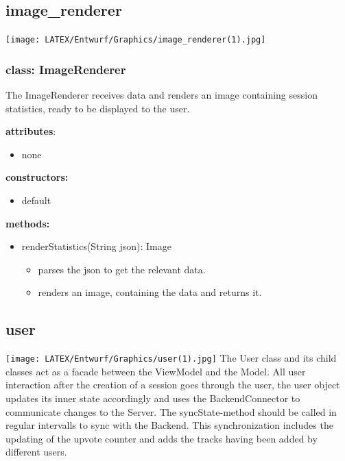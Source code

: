 \documentclass[oneside, ngerman]{sdqtechreport}
\begin{document}
\subsection{image\_renderer}
\texttt{[image: LATEX/Entwurf/Graphics/image\_renderer(1).jpg]}
\subsubsection{class: ImageRenderer}
The ImageRenderer receives data and renders an image containing session statistics, ready to be displayed to the user.

\textbf{attributes}:
\begin{itemize}
    \item none
\end{itemize}
\textbf{constructors:}
\begin{itemize}
    \item default
\end{itemize}
\textbf{methods:}
\begin{itemize}
    \item renderStatistics(String json): Image
    \begin{itemize}
        \item parses the json to get the relevant data.
        \item renders an image, containing the data and returns it.
    \end{itemize}
\end{itemize} 


\subsection{user}

\texttt{[image: LATEX/Entwurf/Graphics/user(1).jpg]}
The User class and its child classes act as a facade between the ViewModel and the Model. All user interaction after the creation of a session goes through the user, the user object updates its inner state accordingly and uses the BackendConnector to communicate changes to the Server.
The syncState-method should be called in regular intervalls to sync with the Backend. This synchronization includes the updating of the upvote counter and adds the tracks having been added by different users. 
\end{document}

